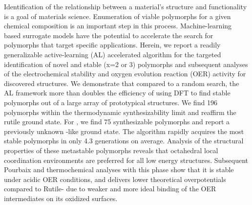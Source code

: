 %


%
Identification of the relationship between a material's structure and functionality is a goal of materials science.
Enumeration of viable polymorphs for a given chemical composition is an important step in this process.
%
Machine-learning based surrogate models have the potential to accelerate the search for polymorphs that target specific applications.
%
Herein, we report a readily generalizable active-learning (AL) accelerated algorithm for the targeted identification of novel and stable \IrOx (x=2 or 3) polymorphs and subsequent analyses of the electrochemical stability and oxygen evolution reaction (OER) activity for discovered structures.
%
We demonstrate that compared to a random search,
the AL framework more than doubles the efficiency of using DFT to find stable polymorphs out of a large array of prototypical structures.
%
We find \num{196} \IrOtwo polymorphs within the thermodynamic synthesizability limit and reaffirm the rutile ground state.
%
For \IrOthree, we find \num{75} synthesizable polymorphs and report a previously unknown -like ground state.
%
The algorithm rapidly acquires the most stable polymorphs in only \num{4.3} generations on average. %
%
Analysis of the structural properties of these metastable polymorphs reveals that octahedral local coordination environments are preferred for all low energy structures.
%
Subsequent Pourbaix and thermochemical analyses with this \aIrOthree phase show that it is stable under acidic OER conditions,
and delivers lower theoretical overpotentials compared to Rutile- due to weaker and more ideal binding of the OER intermediates on its oxidized surfaces.





